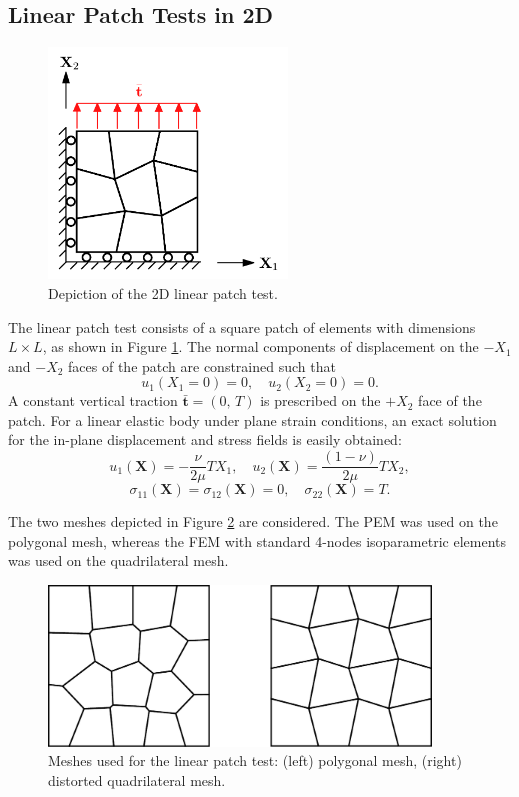 \subsection*{Linear Patch Tests in 2D}

\begin{figure}[!h]
    \centering
    \includegraphics[width=2.5in]{figures/linear_patch_test.pdf}
    	\caption{Depiction of the 2D linear patch test.}
    \label{fig:linear_patch_test}
\end{figure}

The linear patch test consists of a square patch of elements with dimensions $L \times L$, as shown in Figure \ref{fig:linear_patch_test}. The normal components of displacement on the $-X_1$ and $-X_2$ faces of the patch are constrained such that
\begin{equation}
	u_1 (X_1 = 0) = 0, \quad u_2 (X_2 = 0) = 0.
\end{equation}
A constant vertical traction $\bar{\mathbf{t}} = (0, \, T)$ is prescribed on the $+X_2$ face of the patch. For a linear elastic body under plane strain conditions, an exact solution for the in-plane displacement and stress fields is easily obtained:
\begin{equation}
	u_1 (\mathbf{X}) = - \frac{\nu}{2 \mu} T X_1, \quad u_2 (\mathbf{X}) = \frac{(1-\nu)}{2 \mu} T X_2,
\end{equation}
\begin{equation}
	\sigma_{11} (\mathbf{X}) = \sigma_{12} (\mathbf{X}) = 0, \quad \sigma_{22} (\mathbf{X}) = T.
\end{equation}

The two meshes depicted in Figure \ref{fig:patch_test_meshes} are considered. The PEM was used on the polygonal mesh, whereas the FEM with standard 4-nodes isoparametric elements was used on the quadrilateral mesh.
\begin{figure}[!h]
    \centering
    \includegraphics[width=4.0in]{figures/patch_test_meshes.pdf}
    	\caption{Meshes used for the linear patch test: (left) polygonal mesh, (right) distorted quadrilateral mesh.}
    \label{fig:patch_test_meshes}
\end{figure}

